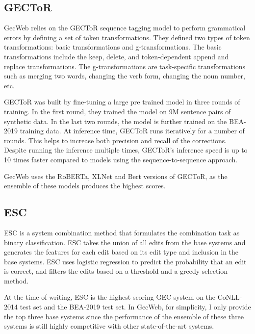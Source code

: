 \subsection{GECToR}
\label{gector}

GecWeb relies on the GECToR sequence tagging model to perform grammatical errors by defining a set of token transformations.
They defined two types of token transformations: basic transformations and g-transformations.
The basic transformations include the keep, delete, and token-dependent append and replace transformations.
The g-transformations are task-specific transformations such as merging two words, changing the verb form, changing the noun number, etc.

GECToR was built by fine-tuning a large pre trained model in three rounds of training.
In the first round, they trained the model on 9M sentence pairs of synthetic data.
In the last two rounds, the model is further trained on the BEA-2019 training data.
At inference time, GECToR runs iteratively for a number of rounds.
This helps to increase both precision and recall of the corrections.
Despite running the inference multiple times, GECToR's inference speed is up to 10 times faster compared to models using the sequence-to-sequence approach.

GecWeb uses the RoBERTa, XLNet and Bert versions of GECToR, as the ensemble of these models produces the highest scores.

\subsection{ESC}
\label{esc}

ESC is a system combination method that formulates the combination task as binary classification.
ESC takes the union of all edits from the base systems and generates the features for each edit based on its edit type and inclusion in the base systems.
ESC uses logistic regression to predict the probability that an edit is correct, and filters the edits based
on a threshold and a greedy selection method.

At the time of writing, ESC is the highest scoring GEC system on the CoNLL-2014 test set and the BEA-2019 test set.
In GecWeb, for simplicity, I only provide the top three base systems since the performance of the
ensemble of these three systems is still highly competitive with other state-of-the-art systems.

